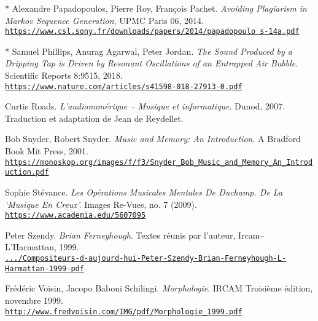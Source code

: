 \begin{thebibliography}{99}
	* Alexandre Papadopoulos, Pierre Roy, Fran\c cois Pachet. \textit{Avoiding Plagiarism in Markov Sequence Generation}, UPMC Paris 06, 2014.\\ \href{https://www.csl.sony.fr/downloads/papers/2014/papadopoulo s-14a.pdf}{\scriptsize{\texttt{https://www.csl.sony.fr/downloads/papers/2014/papadopoulo s-14a.pdf}}} \normalsize{}
	
	* Samuel Phillips,  Anurag Agarwal, Peter Jordan. \textit{The Sound Produced by a Dripping Tap is Driven by Resonant Oscillations of an Entrapped Air Bubble}. Scientific Reports 8:9515, 2018.\\ 
	\href{https://www.nature.com/articles/s41598-018-27913-0}{\scriptsize{\texttt{https://www.nature.com/articles/s41598-018-27913-0.pdf}}} \normalsize{}
	
	Curtis Roads. \textit{L'audionum\'{e}rique -- Musique et informatique}. Dunod, 2007. Traduction et adaptation de Jean de Reydellet.
	
	Bob Snyder, Robert Snyder. \textit{Music and Memory: An Introduction}. A Bradford Book
Mit Press, 2001.\\ 
	\href{https://monoskop.org/images/f/f3/Snyder\_Bob\_Music\_and\_Memory\_An\_Introduction.pdf}{\scriptsize{\texttt{https://monoskop.org/images/f/f3/Snyder\_Bob\_Music\_and\_Memory\_An\_Introduction.pdf}}} \normalsize{}
	
	Sophie St\'{e}vance. \textit{Les Op\'{e}rations Musicales Mentales De Duchamp. De La `Musique En Creux'.} Images Re-Vues, no. 7 (2009). \\ 
	\href{https://www.academia.edu/5607095}{\scriptsize{\texttt{https://www.academia.edu/5607095}}} \normalsize{}
	
	Peter Szendy. \textit{Brian Ferneyhough}. Textes r\'{e}unis par l'auteur, Ircam--L'Har\-mattan, 1999.\\ 
	\href{https://www.scribd.com/document/365564172/Compositeurs-d-aujourd-hui-Peter-Szendy-Brian-Ferneyhough-L-Harmattan-1999-pdf}{\scriptsize{\texttt{.../Compositeurs-d-aujourd-hui-Peter-Szendy-Brian-Ferneyhough-L-Harmattan-1999-pdf}}} \normalsize{}
			
	Fr\'{e}d\'{e}ric Voisin, Jacopo Baboni Schilingi. \textit{Morphologie}. IRCAM Troisi\`{e}me \'{e}dition, novembre 1999.\\ 
	\href{http://www.fredvoisin.com/IMG/pdf/Morphologie\_1999.pdf}{\scriptsize{\texttt{http://www.fredvoisin.com/IMG/pdf/Morphologie\_1999.pdf}}} \normalsize{}
	

\end{thebibliography}
